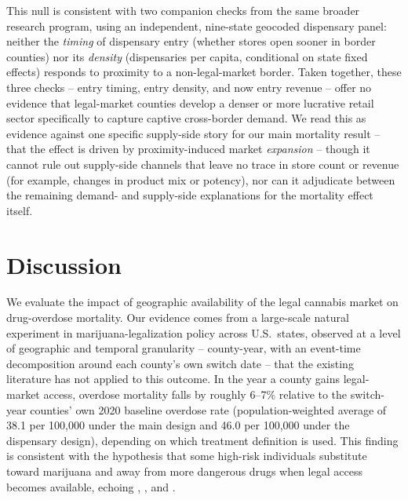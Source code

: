 \documentclass{article}
\begin{document}
This null is consistent with two companion checks from the same broader research program, using an independent,
nine-state geocoded dispensary panel: neither the \emph{timing} of dispensary entry (whether stores open sooner
in border counties) nor its \emph{density} (dispensaries per capita, conditional on state fixed effects)
responds to proximity to a non-legal-market border. Taken together, these three checks -- entry timing, entry
density, and now entry revenue -- offer no evidence that legal-market counties develop a denser or more
lucrative retail sector specifically to capture captive cross-border demand. We read this as evidence against
one specific supply-side story for our main mortality result -- that the effect is driven by proximity-induced
market \emph{expansion} -- though it cannot rule out supply-side channels that leave no trace in store count or
revenue (for example, changes in product mix or potency), nor can it adjudicate between the remaining demand-
and supply-side explanations for the mortality effect itself.



\section{Discussion}

We evaluate the impact of geographic availability of the legal cannabis market on drug-overdose mortality. Our
evidence comes from a large-scale natural experiment in marijuana-legalization policy across U.S.\ states, observed
at a level of geographic and temporal granularity -- county-year, with an event-time decomposition around each
county's own switch date -- that the existing literature has not applied to this outcome. In the year a county
gains legal-market access, overdose mortality falls by roughly 6--7\% relative to the switch-year counties' own
2020 baseline overdose rate (population-weighted average of 38.1 per 100{,}000 under the main design and 46.0 per
100{,}000 under the dispensary design), depending on which treatment definition is used. This finding is consistent with the
hypothesis that some high-risk individuals substitute toward marijuana and away from more dangerous drugs when
legal access becomes available, echoing \citet{PowellPaculaJacobson2018}, \citet{ChanBurkhardtFlyr2020}, and
\citet{Denkyirah2026}.
\end{document}
